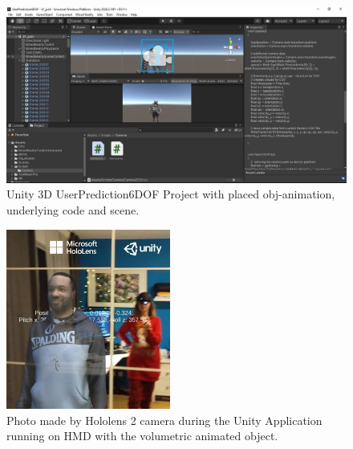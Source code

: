 \begin{figure}[htb]
	\begin{center}
		\includegraphics[width=1\textwidth, keepaspectratio]{gfx/unity.jpeg}
		\caption{\label{fig:unity} Unity 3D UserPrediction6DOF Project with placed obj-animation, underlying code and scene.}
	\end{center}
\end{figure}
\begin{figure}
	\centering
	\includegraphics[width=0.48\textwidth]{gfx/josh.jpeg}
	\caption{\label{fig:josh}Photo made by Hololens 2 camera during the Unity Application running on HMD with the volumetric animated object.}
\end{figure}

